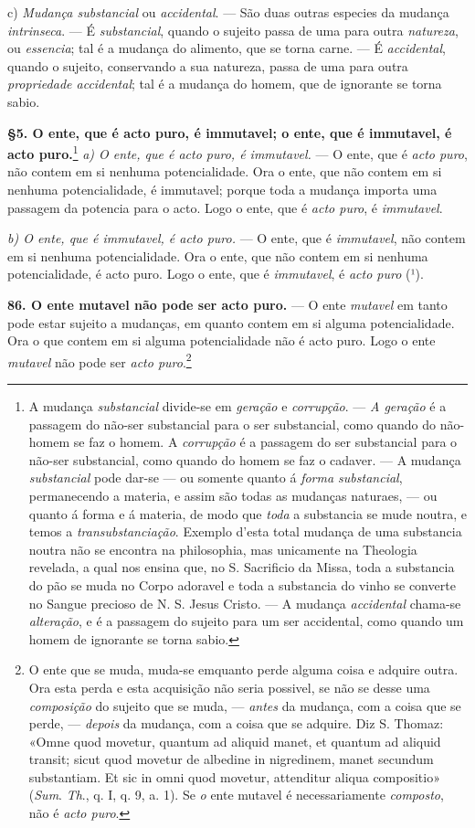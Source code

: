 c) \emph{Mudança substancial} ou \emph{accidental}. --- São duas outras especies da mudança \emph{intrinseca}. --- É \emph{substancial}, quando o sujeito passa de uma para outra \emph{natureza}, ou \emph{essencia}; tal é a mudança do alimento, que se torna carne. --- É \emph{accidental}, quando o sujeito, conservando a sua natureza, passa de uma para outra \emph{propriedade accidental}; tal é a mudança do homem, que de ignorante se torna sabio.

\textbf{§5. O ente, que é acto puro, é immutavel; o ente, que é immutavel, é acto puro.}\footnote{A mudança \emph{substancial} divide-se em \emph{geração} e \emph{corrupção}. --- \emph{A geração} é a passagem do não-ser substancial para o ser substancial, como quando do não-homem se faz o homem. A \emph{corrupção} é a passagem do ser substancial para o não-ser substancial, como quando do homem se faz o cadaver. --- A mudança \emph{substancial} pode dar-se --- ou somente quanto á \emph{forma substancial}, permanecendo a materia, e assim são todas as mudanças naturaes, --- ou quanto á forma e á materia, de modo que \emph{toda} a substancia se mude noutra, e temos a \emph{transubstanciação}. Exemplo d'esta total mudança de uma substancia noutra não se encontra na philosophia, mas unicamente na Theologia revelada, a qual nos ensina que, no S. Sacrificio da Missa, toda a substancia do pão se muda no Corpo adoravel e toda a substancia do vinho se converte no Sangue precioso de N. S. Jesus Cristo. --- A mudança \emph{accidental} chama-se \emph{alteração}, e é a passagem do sujeito para um ser accidental, como quando um homem de ignorante se torna sabio.}
 \emph{a) O ente, que é acto puro, é immutavel.} --- O ente, que é \emph{acto puro}, não contem em si nenhuma potencialidade. Ora o ente, que não contem em si nenhuma potencialidade, é immutavel; porque toda a mudança importa uma passagem da potencia para o acto. Logo o ente, que é \emph{acto puro}, é \emph{immutavel}.

\emph{b) O ente, que é immutavel, é acto puro.} --- O ente, que é \emph{immutavel}, não contem em si nenhuma potencialidade. Ora o ente, que não contem em si nenhuma potencialidade, é acto puro. Logo o ente, que é \emph{immutavel}, é \emph{acto puro} (¹).

\textbf{86. O ente mutavel não pode ser acto puro.} --- O ente \emph{mutavel} em tanto pode estar sujeito a mudanças, em quanto contem em si alguma potencialidade. Ora o que contem em si alguma potencialidade não é acto puro. Logo o ente \emph{mutavel} não pode ser \emph{acto puro}.\footnote{O ente que se muda, muda-se emquanto perde alguma coisa e adquire outra. Ora esta perda e esta acquisição não seria possivel, se não se desse uma \emph{composição} do sujeito que se muda, --- \emph{antes} da mudança, com a coisa que se perde, --- \emph{depois} da mudança, com a coisa que se adquire. Diz S. Thomaz: «Omne quod movetur, quantum ad aliquid manet, et quantum ad aliquid transit; sicut quod movetur de albedine in nigredinem, manet secundum substantiam. Et sic in omni quod movetur, attenditur aliqua compositio» (\emph{Sum}. \emph{Th}., q. I, q. 9, a. 1). Se \emph{o} ente mutavel é necessariamente \emph{composto}, não é \emph{acto puro}.}

